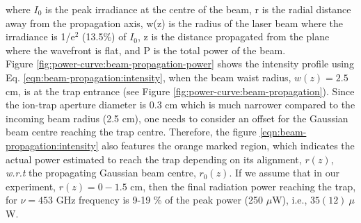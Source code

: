 where $I_0$ is the peak irradiance at the centre of the beam, r is the radial
distance away from the propagation axis, w(z) is the radius of the laser beam
where the irradiance is 1/e$^2$ (13.5\%) of $I_0$, z is the distance propagated
from the plane where the wavefront is flat, and P is the total power of the
beam.\\

Figure \ref{fig:power-curve:beam-propagation-power} shows the intensity profile
using Eq. \ref{eqn:beam-propagation:intensity}, when the beam waist radius,
$w(z)=2.5$ cm, is at the trap entrance (see Figure
\ref{fig:power-curve:beam-propagation}). Since the ion-trap aperture diameter
is 0.3 cm which is much narrower compared to the incoming beam radius (2.5 cm),
one needs to consider an offset for the Gaussian beam centre reaching the trap
centre. Therefore, the figure \ref{eqn:beam-propagation:intensity} also
features the orange marked region, which indicates the actual power estimated
to reach the trap depending on its alignment, $r(z)$, \emph{w.r.t} the
propagating Gaussian beam centre, $r_0(z)$. If we assume that in our
experiment, $r(z)=0-1.5$ cm, then the final radiation power reaching the trap,
for $\nu=453$ GHz frequency is 9-19 \% of the peak power (250 $\mu$W),
i.e., $35(12)\ \mu$W.

